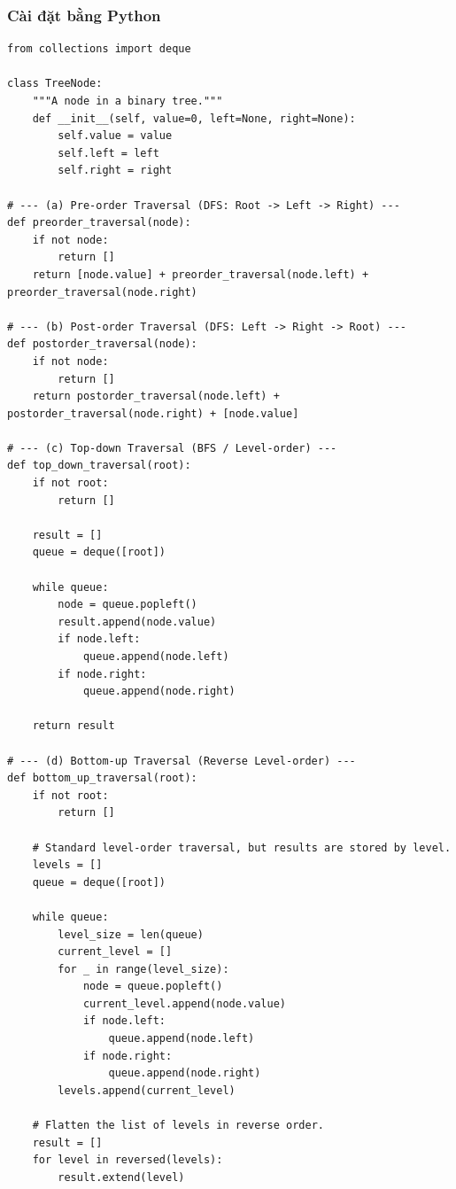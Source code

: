 \documentclass[a4paper,12pt]{article}
\begin{document}
\subsubsection{Cài đặt bằng Python}
\begin{lstlisting}[style=pythonstyle, caption={Các thuật toán duyệt cây nhị phân trong Python.}, label={lst:python_tree_traversal}]
from collections import deque

class TreeNode:
    """A node in a binary tree."""
    def __init__(self, value=0, left=None, right=None):
        self.value = value
        self.left = left
        self.right = right

# --- (a) Pre-order Traversal (DFS: Root -> Left -> Right) ---
def preorder_traversal(node):
    if not node:
        return []
    return [node.value] + preorder_traversal(node.left) + preorder_traversal(node.right)

# --- (b) Post-order Traversal (DFS: Left -> Right -> Root) ---
def postorder_traversal(node):
    if not node:
        return []
    return postorder_traversal(node.left) + postorder_traversal(node.right) + [node.value]

# --- (c) Top-down Traversal (BFS / Level-order) ---
def top_down_traversal(root):
    if not root:
        return []
    
    result = []
    queue = deque([root])
    
    while queue:
        node = queue.popleft()
        result.append(node.value)
        if node.left:
            queue.append(node.left)
        if node.right:
            queue.append(node.right)
            
    return result

# --- (d) Bottom-up Traversal (Reverse Level-order) ---
def bottom_up_traversal(root):
    if not root:
        return []
    
    # Standard level-order traversal, but results are stored by level.
    levels = []
    queue = deque([root])
    
    while queue:
        level_size = len(queue)
        current_level = []
        for _ in range(level_size):
            node = queue.popleft()
            current_level.append(node.value)
            if node.left:
                queue.append(node.left)
            if node.right:
                queue.append(node.right)
        levels.append(current_level)
    
    # Flatten the list of levels in reverse order.
    result = []
    for level in reversed(levels):
        result.extend(level)
        

\end{lstlisting}
\end{document}
